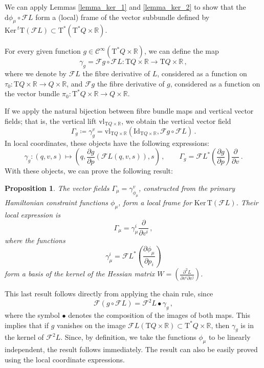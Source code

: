 \documentclass[11pt]{article}
\theoremstyle{plain}
\newtheorem{proposition}[theorem]{Proposition}
\theoremstyle{definition}
\newcommand{\R}{\mathbb{R}}
\renewcommand{\d}{\mathrm{d}}
\newcommand{\Cinfty}{\mathscr{C}^\infty}
\newcommand{\T}{{\mathrm T}}
\let\Tan\T
\newcommand{\Id}{\mathrm{Id}}
\newcommand{\F}{\mathcal{F}}
\newcommand{\parder}[2]{\frac{\partial #1}{\partial #2}}
\def\d{\mathrm{d}}
\def\d{\mathrm{d}}
\def\Ker{\mathrm{Ker \,}}
\def\Tan{\mathrm{T}}
\def\FL{\mathcal{F} L}
\begin{document}
We can apply Lemmas \ref{lemma_ker_1} and \ref{lemma_ker_2} to show that the $\d \phi_{\mu} \circ \FL$ form a (local) frame of the vector subbundle defined by $\Ker ^t\Tan (\FL) \subset \Tan^* (\Tan^*Q\times \R)$.

For every given function $g \in \Cinfty(\Tan^*Q \times \R)$, we can define the map
$$\gamma_g = \F g \circ \F L \colon \Tan Q \times \R \to \Tan Q \times \R\,,$$
where we denote by $\FL$ the fibre derivative of $L$, considered as a function on
$\tau_0 \colon \T Q\times\R \to Q \times \R$,
and $\F g$ the fibre derivative of $g$,
considered as a function on the vector bundle
$\pi_0 \colon \T^* Q\times\R \to Q \times \R$.

If we apply the natural bijection between fibre bundle maps and vertical vector fields; that is, the vertical lift $\mathrm{vl}_{\Tan Q \times \R }$, we obtain the vertical vector field
$$\Gamma_g \coloneqq \gamma_g^{v}=\mathrm{vl}_{\Tan Q \times \R}(\Id_{\Tan Q\times \R}, \F g \circ \FL)\,.$$
In local coordinates, these objects have the following expressions:
\begin{equation}
    \gamma_g \colon (q,v,s) \mapsto \left( q, \parder{g}{p} (\FL (q,v,s)),s \right)\,, \qquad \Gamma_g= \FL^{*}\left( \parder{g}{p}  \right)\parder{}{v}\,. 
\end{equation}
With these objects, we can prove the following result:
\begin{proposition}\label{Ker_TFL}
    The vector fields $\Gamma_{\mu} = \gamma_{\phi_{\mu}}^v$, constructed from the primary Hamiltonian constraint functions $\phi_{\mu}$, form a local frame for $\Ker \Tan(\FL)$. Their local expression is
    $$\Gamma_{\mu}=\gamma_{\mu}^i \parder{}{v^i}\,,$$
    where the functions
    $$\gamma_{\mu}^i= \FL^*\left(  \parder{\phi_{\mu}}{p_i} \right)$$
    form a basis of the kernel of the Hessian matrix $W=\displaystyle
\left( \frac{\partial^2 L}{\partial v^i \partial v^j} \right)$.
\end{proposition}

This last result follows directly from applying the chain rule, since
$$\F (g \circ \F L) = \F^2 L \bullet \gamma_g\,, $$
where the symbol $\bullet$ denotes the composition of the images of both maps. This implies that if $g$ vanishes on the image $\FL (\Tan Q \times \R) \subset \Tan^* Q \times \R$, then $\gamma_g$ is in the kernel of $\F^2 L$. Since, by definition, we take the functions $\phi_{\mu}$ to be linearly independent, the result follows immediately.
The result can also be easily proved using the local coordinate expressions.
\end{document}
